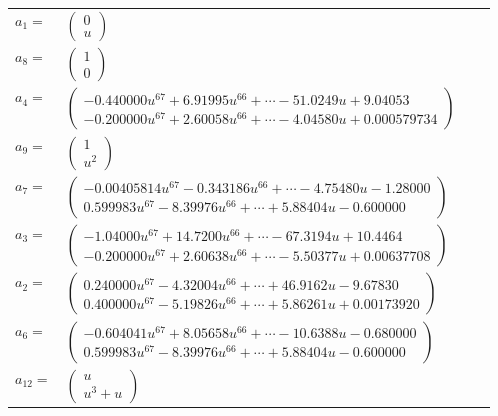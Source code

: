 \documentclass[1p]{elsarticle_modified}
\theoremstyle{definition}
\begin{document}
\begin{tabular}{m{7pt} m{180pt} m{7pt} m{180pt} }
\flushright $a_{1}=$&$\begin{pmatrix}0\\u\end{pmatrix}$ \\
\flushright $a_{8}=$&$\begin{pmatrix}1\\0\end{pmatrix}$ \\
\flushright $a_{4}=$&$\begin{pmatrix}-0.440000 u^{67}+6.91995 u^{66}+\cdots-51.0249 u+9.04053\\-0.200000 u^{67}+2.60058 u^{66}+\cdots-4.04580 u+0.000579734\end{pmatrix}$ \\
\flushright $a_{9}=$&$\begin{pmatrix}1\\u^2\end{pmatrix}$ \\
\flushright $a_{7}=$&$\begin{pmatrix}-0.00405814 u^{67}-0.343186 u^{66}+\cdots-4.75480 u-1.28000\\0.599983 u^{67}-8.39976 u^{66}+\cdots+5.88404 u-0.600000\end{pmatrix}$ \\
\flushright $a_{3}=$&$\begin{pmatrix}-1.04000 u^{67}+14.7200 u^{66}+\cdots-67.3194 u+10.4464\\-0.200000 u^{67}+2.60638 u^{66}+\cdots-5.50377 u+0.00637708\end{pmatrix}$ \\
\flushright $a_{2}=$&$\begin{pmatrix}0.240000 u^{67}-4.32004 u^{66}+\cdots+46.9162 u-9.67830\\0.400000 u^{67}-5.19826 u^{66}+\cdots+5.86261 u+0.00173920\end{pmatrix}$ \\
\flushright $a_{6}=$&$\begin{pmatrix}-0.604041 u^{67}+8.05658 u^{66}+\cdots-10.6388 u-0.680000\\0.599983 u^{67}-8.39976 u^{66}+\cdots+5.88404 u-0.600000\end{pmatrix}$ \\
\flushright $a_{12}=$&$\begin{pmatrix}u\\u^3+u\end{pmatrix}$ \\

\end{tabular}
\end{document}
